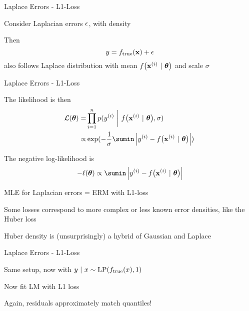 \documentclass[11pt,compress,t,notes=noshow, xcolor=table]{beamer}
\begin{document}
\begin{framei}[sep=M]{Laplace Errors - L1-Loss}

\item Consider Laplacian errors $\epsilon$, with density 

\vfill

\item Then
$$
y = f_{\text{true}}(\mathbf{x}) + \epsilon 
$$
also follows Laplace distribution with mean $f\big(\mathbf{x}^{(i)} ~|~ \bm{\theta}\big)$ and scale  $\sigma$ 

\end{framei}


\begin{framei}[sep=M]{Laplace Errors - L1-Loss}

\item The likelihood is then 
\begin{align*}
\LL(\thetav) =& \prod_{i=1}^n \pdf(\yi ~\bigg|~ \fxit, \sigma) \\ 
\propto& \exp(-\frac{1}{\sigma}\sumin \left|\yi - \fxit\right|)\,
\end{align*}
\item The negative log-likelihood is
$$
- \loglt \propto \sumin \left|\yi - \fxit\right|
$$
\item MLE for Laplacian errors = ERM with L1-loss 
\item Some losses correspond to more complex or less known error densities, like the Huber loss 
\item Huber density is (unsurprisingly) a hybrid of Gaussian and Laplace

\end{framei}
\begin{framei}[sep=M]{Laplace Errors - L1-Loss}

\item Same setup, now with $y ~|~x \sim \text{LP}(f_{\text{true}}(x), 1)$ 
\item Now fit LM with L1 loss

\vfill


\item Again, residuals approximately match quantiles!

\end{framei}
\end{document}
